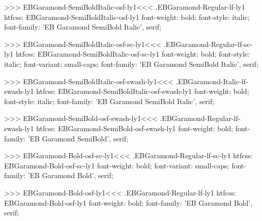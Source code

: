 {{>>>
\<EBGaramond-SemiBoldItalic-osf-ly1\><<<
.EBGaramond-Regular-lf-ly1
htfcss:  EBGaramond-SemiBoldItalic-osf-ly1  font-weight: bold; font-style: italic; font-family: 'EB Garamond SemiBold Italic', serif;

>>>
\<EBGaramond-SemiBoldItalic-osf-sc-ly1\><<<
.EBGaramond-Regular-lf-sc-ly1
htfcss:  EBGaramond-SemiBoldItalic-osf-sc-ly1  font-weight: bold; font-style: italic; font-variant: small-caps; font-family: 'EB Garamond SemiBold Italic', serif;

>>>
\<EBGaramond-SemiBoldItalic-osf-swash-ly1\><<<
.EBGaramond-Italic-lf-swash-ly1
htfcss:  EBGaramond-SemiBoldItalic-osf-swash-ly1  font-weight: bold; font-style: italic; font-family: 'EB Garamond SemiBold Italic', serif;

>>>
\<EBGaramond-SemiBold-osf-swash-ly1\><<<
.EBGaramond-Regular-lf-swash-ly1
htfcss:  EBGaramond-SemiBold-osf-swash-ly1  font-weight: bold; font-family: 'EB Garamond SemiBold', serif;

>>>
\<EBGaramond-Bold-osf-sc-ly1\><<<
.EBGaramond-Regular-lf-sc-ly1
htfcss:  EBGaramond-Bold-osf-sc-ly1  font-weight: bold; font-variant: small-caps; font-family: 'EB Garamond Bold', serif;

>>>
\<EBGaramond-Bold-osf-ly1\><<<
.EBGaramond-Regular-lf-ly1
htfcss:  EBGaramond-Bold-osf-ly1  font-weight: bold; font-family: 'EB Garamond Bold', serif;

}}
